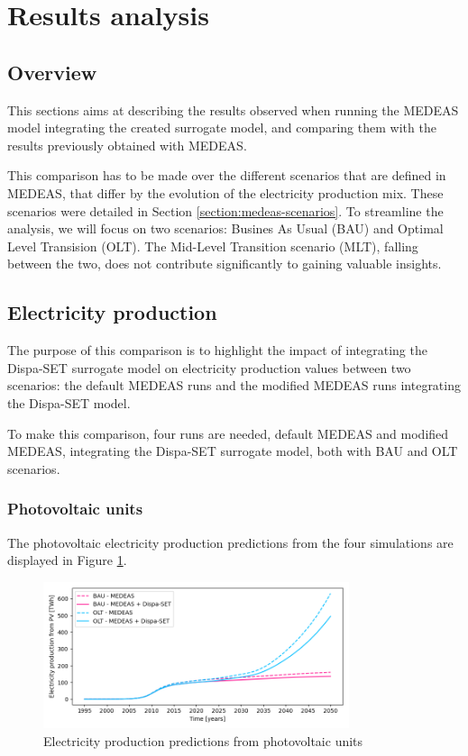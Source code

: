 \section{Results analysis}

\subsection{Overview}

This sections aims at describing the results observed when running the MEDEAS model integrating the created surrogate model, and comparing them with the results previously obtained with MEDEAS.

This comparison has to be made over the different scenarios that are defined in MEDEAS, that differ by the evolution of the electricity production mix. These scenarios were detailed in Section \ref{section:medeas-scenarios}. To streamline the analysis, we will focus on two scenarios: Busines As Usual (BAU) and Optimal Level Transision (OLT). The Mid-Level Transition scenario (MLT), falling between the two, does not contribute significantly to gaining valuable insights.

\subsection{Electricity production}

The purpose of this comparison is to highlight the impact of integrating the Dispa-SET surrogate model on electricity production values between two scenarios: the default MEDEAS runs and the modified MEDEAS runs integrating the Dispa-SET model.

To make this comparison, four runs are needed, default MEDEAS and modified MEDEAS, integrating the Dispa-SET surrogate model, both with BAU and OLT scenarios.

\subsubsection{Photovoltaic units}

The photovoltaic electricity production predictions from the four simulations are displayed in Figure \ref{fig:electricity-production-PV}.

\begin{figure}[h]
    \centering
    \includegraphics[width=0.8\textwidth]{resources/images/electricity-production_PV.png}
    \caption{Electricity production predictions from photovoltaic units}
    \label{fig:electricity-production-PV}
\end{figure}

